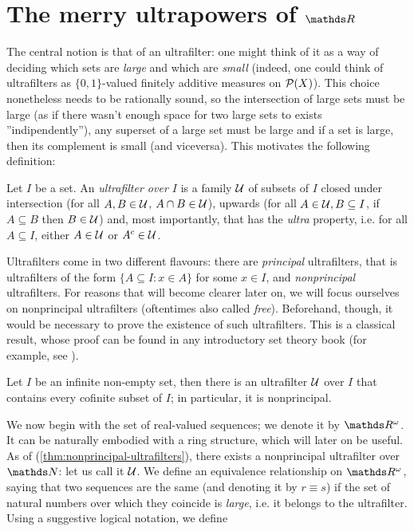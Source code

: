 \documentclass[draft.tex]{subfiles}
\begin{document}
\section{The merry ultrapowers of $\RR$}
The central notion is that of an ultrafilter: one might think of it as a way of deciding which sets are \textit{large} and which are \textit{small} (indeed, one could think of ultrafilters as $\{0,1\}$-valued finitely additive measures on $\mathcal{P}(X)$). This choice nonetheless needs to be rationally sound, so the intersection of large sets must be large (as if there wasn't enough space for two large sets to exists ''indipendently''), any superset of a large set must be large and if a set is large, then its complement is small (and viceversa). This motivates the following definition:
\begin{definition}
\label{def:ultrafilter}
Let $I$ be a set. An \emph{ultrafilter over $I$} is a family $\mathcal{U}$ of subsets of $I$ closed under intersection (for all $A, B \in \mathcal{U}$, $A \cap B \in \mathcal{U}$), upwards (for all $A \in \mathcal{U}, B \subseteq I$, if $A \subseteq B$ then $B \in \mathcal{U}$) and, most importantly, that has the \emph{ultra} property, i.e. for all $A \subseteq I$, either $A \in \mathcal{U}$ or $A^{c} \in \mathcal{U}$.
\end{definition}
Ultrafilters come in two different flavours: there are \emph{principal} ultrafilters, that is ultrafilters of the form $\{A \subseteq I: x \in A\}$ for some $x \in I$, and \emph{nonprincipal} ultrafilters. For reasons that will become clearer later on, we will focus ourselves on nonprincipal ultrafilters (oftentimes also called \emph{free}). Beforehand, though, it would be necessary to prove the existence of such ultrafilters. This is a classical result, whose proof can be found in any introductory set theory book (for example, see \cite{schimmerling}).
\begin{theorem}
\label{thm:nonprincipal-ultrafilters}
Let $I$ be an infinite non-empty set, then there is an ultrafilter $\mathcal{U}$ over $I$ that contains every cofinite subset of $I$; in particular, it is nonprincipal.
\end{theorem}
We now begin with the set of real-valued sequences; we denote it by $\RR^{\omega}$. It can be naturally embodied with a ring structure, which will later on be useful. As of (\ref{thm:nonprincipal-ultrafilters}), there exists a nonprincipal ultrafilter over $\NN$: let us call it $\mathcal{U}$. We define an equivalence relationship on $\RR^{\omega}$, saying that two sequences are the same (and denoting it by $r \equiv s$) if the set of natural numbers over which they coincide is \textit{large}, i.e. it belongs to the ultrafilter. Using a suggestive logical notation, we define
\end{document}
